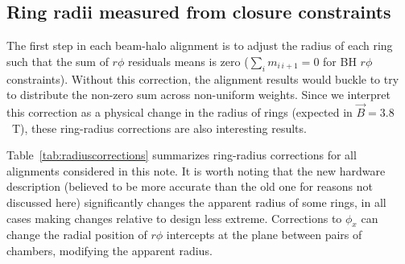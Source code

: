 \documentclass[12pt]{article}
\begin{document}
\subsection{Ring radii measured from closure constraints}

The first step in each beam-halo alignment is to adjust the radius of
each ring such that the sum of $r\phi$ residuals means is zero
($\sum_i m_{i\,i+1} = 0$ for BH $r\phi$ constraints).  Without this
correction, the alignment results would buckle to try to distribute
the non-zero sum across non-uniform weights.  Since we interpret this
correction as a physical change in the radius of rings (expected in
$\vec{B}=3.8$~T), these ring-radius corrections are also interesting
results.

Table~\ref{tab:radiuscorrections} summarizes ring-radius corrections
for all alignments considered in this note.  It is worth noting that
the new hardware description (believed to be more accurate than the
old one for reasons not discussed here) significantly changes
the apparent radius of some rings, in all cases making changes
relative to design less extreme.  Corrections to $\phi_x$ can change
the radial position of $r\phi$ intercepts at the plane between pairs
of chambers, modifying the apparent radius.
\end{document}
